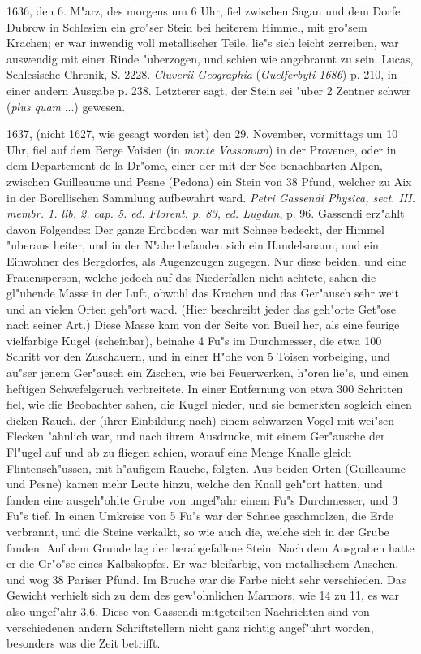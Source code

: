 \documentclass[a4paper, 11pt, oneside, polutonikogreek, german]{article}
\begin{document}
1636, den 6. M"arz, des morgens um 6 Uhr, fiel zwischen Sagan und dem Dorfe Dubrow in Schlesien ein gro"ser Stein bei heiterem Himmel, mit gro"sem Krachen; er war inwendig voll metallischer Teile, lie"s sich leicht zerreiben, war auswendig mit einer Rinde "uberzogen, und schien wie angebrannt zu sein. Lucas, Schlesische Chronik, S. 2228. \emph{Cluverii Geographia} (\emph{Guelferbyti 1686}) p. 210, in einer andern Ausgabe p. 238. Letzterer sagt, der Stein sei "uber 2 Zentner schwer (\emph{plus quam} ...) gewesen.

1637, (nicht 1627, wie gesagt worden ist) den 29. November, vormittags um 10 Uhr, fiel auf dem Berge Vaisien (in \emph{monte Vassonum}) in der Provence, oder in dem Departement de la Dr"ome, einer der mit der See benachbarten Alpen, zwischen Guilleaume und Pesne (Pedona) ein Stein von 38 Pfund, welcher zu Aix in der Borellischen Sammlung aufbewahrt ward. \emph{Petri Gassendi Physica, sect. III. membr. 1. lib. 2. cap. 5. ed. Florent. p. 83, ed. Lugdun}, p. 96. Gassendi erz"ahlt davon Folgendes: Der ganze Erdboden war mit Schnee bedeckt, der Himmel "uberaus heiter, und in der N"ahe befanden sich ein Handelsmann, und ein Einwohner des Bergdorfes, als Augenzeugen zugegen. Nur diese beiden, und eine Frauensperson, welche jedoch auf das Niederfallen nicht achtete, sahen die gl"uhende Masse in der Luft, obwohl das Krachen und das Ger"ausch sehr weit und an vielen Orten geh"ort ward. (Hier beschreibt jeder das geh"orte Get"ose nach seiner Art.) Diese Masse kam von der Seite von Bueil her, als eine feurige vielfarbige Kugel (scheinbar), beinahe 4 Fu"s im Durchmesser, die etwa 100 Schritt vor den Zuschauern, und in einer H"ohe von 5 Toisen vorbeiging, und au"ser jenem Ger"ausch ein Zischen, wie bei Feuerwerken, h"oren lie"s, und einen heftigen Schwefelgeruch verbreitete. In einer Entfernung von etwa 300 Schritten fiel, wie die Beobachter sahen, die Kugel nieder, und sie bemerkten sogleich einen dicken Rauch, der (ihrer Einbildung nach) einem schwarzen Vogel mit wei"sen Flecken "ahnlich war, und nach ihrem Ausdrucke, mit einem Ger"ausche der Fl"ugel auf und ab zu fliegen schien, worauf eine Menge Knalle gleich Flintensch"ussen, mit h"aufigem Rauche, folgten. Aus beiden Orten (Guilleaume und Pesne) kamen mehr Leute hinzu, welche den Knall geh"ort hatten, und fanden eine ausgeh"ohlte Grube von ungef"ahr einem Fu"s Durchmesser, und 3 Fu"s tief. In einen Umkreise von 5 Fu"s war der Schnee geschmolzen, die Erde verbrannt, und die Steine verkalkt, so wie auch die, welche sich in der Grube fanden. Auf dem Grunde lag der herabgefallene Stein. Nach dem Ausgraben hatte er die Gr"o"se eines Kalbskopfes. Er war bleifarbig, von metallischem Ansehen, und wog 38 Pariser Pfund. Im Bruche war die Farbe nicht sehr verschieden. Das Gewicht verhielt sich zu dem des gew"ohnlichen Marmors, wie 14 zu 11, es war also ungef"ahr 3,6. Diese von Gassendi mitgeteilten Nachrichten sind von verschiedenen andern Schriftstellern nicht ganz richtig angef"uhrt worden, besonders was die Zeit betrifft.
\end{document}
